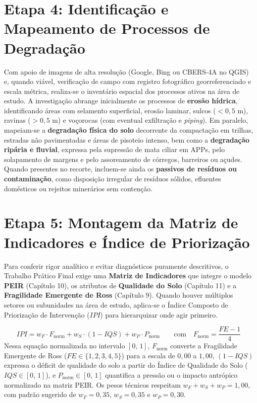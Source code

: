 \section{Etapa 4: Identificação e Mapeamento de Processos de Degradação}

Com apoio de imagens de alta resolução (Google, Bing ou CBERS-4A no QGIS) e, quando viável, verificação de campo com registro fotográfico georreferenciado e escala métrica, realiza-se o inventário espacial dos processos ativos na área de estudo. A investigação abrange inicialmente os processos de \textbf{erosão hídrica}, identificando áreas com selamento superficial, erosão laminar, sulcos ($<0{,}5\text{ m}$), ravinas ($>0{,}5\text{ m}$) e voçorocas (com eventual exfiltração e \textit{piping}). Em paralelo, mapeiam-se a \textbf{degradação física do solo} decorrente da compactação em trilhas, estradas não pavimentadas e áreas de pisoteio intenso, bem como a \textbf{degradação ripária e fluvial}, expressa pela supressão de mata ciliar em APPs, pelo solapamento de margens e pelo assoreamento de córregos, barreiros ou açudes. Quando presentes no recorte, incluem-se ainda os \textbf{passivos de resíduos ou contaminação}, como disposição irregular de resíduos sólidos, efluentes domésticos ou rejeitos minerários sem contenção.

\section{Etapa 5: Montagem da Matriz de Indicadores e Índice de Priorização}

Para conferir rigor analítico e evitar diagnósticos puramente descritivos, o Trabalho Prático Final exige uma \textbf{Matriz de Indicadores} que integre o modelo \textbf{PEIR} (Capítulo 10), os atributos de \textbf{Qualidade do Solo} (Capítulo 11) e a \textbf{Fragilidade Emergente de Ross} (Capítulo 9). Quando houver múltiplos setores ou subunidades na área de estudo, aplica-se o Índice Composto de Priorização de Intervenção ($IPI$) para hierarquizar onde agir primeiro.

\begin{boxFormula}
\[
IPI = w_F \cdot F_{\text{norm}} + w_S \cdot (1 - IQS) + w_P \cdot P_{\text{norm}} \qquad \text{com} \quad F_{\text{norm}} = \frac{FE - 1}{4}
\]
Nessa equação normalizada no intervalo $[0,\,1]$, $F_{\text{norm}}$ converte a Fragilidade Emergente de Ross ($FE \in \{1, 2, 3, 4, 5\}$) para a escala de $0{,}00$ a $1{,}00$, $(1 - IQS)$ expressa o déficit de qualidade do solo a partir do Índice de Qualidade do Solo ($IQS \in [0,\,1]$), e $P_{\text{norm}} \in [0,\,1]$ quantifica a pressão ou o impacto antrópico normalizado na matriz PEIR. Os pesos técnicos respeitam $w_F + w_S + w_P = 1{,}00$, com padrão sugerido de $w_F = 0{,}35$, $w_S = 0{,}35$ e $w_P = 0{,}30$.
\end{boxFormula}

